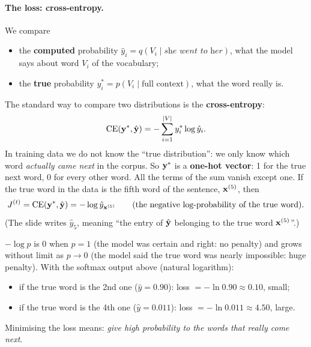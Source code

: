 \paragraph{The loss: cross-entropy.}
We compare
\begin{itemize}[nosep]
  \item the \textbf{computed} probability $\hat y_i = q(V_i \mid \textit{she went to
        her})$, what the model says about word $V_i$ of the vocabulary;
  \item the \textbf{true} probability $y^*_i = p(V_i \mid \text{full context})$, what
        the word really is.
\end{itemize}
The standard way to compare two distributions is the \textbf{cross-entropy}:
\[
  \mathrm{CE}(\mathbf{y}^*, \hat{\mathbf{y}}) = - \sum_{i=1}^{|V|} y^*_i \log \hat y_i .
\]
In training data we do not know the ``true distribution'': we only know which word
\emph{actually came next} in the corpus. So $\mathbf{y}^*$ is a \textbf{one-hot vector}:
1 for the true next word, 0 for every other word. All the terms of the sum vanish
except one. If the true word in the data is the fifth word of the sentence,
$\mathbf{x}^{(5)}$, then
\[
  J^{(t)} = \mathrm{CE}(\mathbf{y}^*, \hat{\mathbf{y}}) = -\log \hat y_{\mathbf{x}^{(5)}}
  \qquad \text{(the negative log-probability of the true word).}
\]
(The slide writes $\hat y_5$, meaning ``the entry of $\hat{\mathbf{y}}$ belonging to the
true word $\mathbf{x}^{(5)}$''.)

\begin{nbintuition}
\notinslides
$-\log p$ is 0 when $p = 1$ (the model was certain and right: no penalty) and grows
without limit as $p \to 0$ (the model said the true word was nearly impossible: huge
penalty). With the softmax output above (natural logarithm):
\begin{itemize}[nosep]
  \item if the true word is the 2nd one ($\hat y = 0.90$): loss
        $= -\ln 0.90 \approx 0.10$, small;
  \item if the true word is the 4th one ($\hat y = 0.011$): loss
        $= -\ln 0.011 \approx 4.50$, large.
\end{itemize}
Minimising the loss means: \emph{give high probability to the words that really come
next}.
\end{nbintuition}

